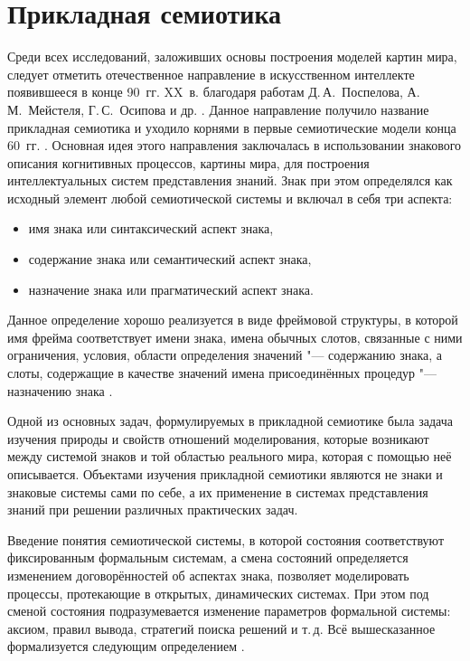 \section{Прикладная семиотика} \label{sect1_3}

Среди всех исследований, заложивших основы построения моделей картин мира, следует отметить отечественное направление в искусственном интеллекте появившееся в конце 90~гг. XX~в. благодаря работам Д.\,А.~Поспелова, А.\,М.~Мейстеля, Г.\,С.~Осипова и др. \cite{Osipov1995,Pospelov1996,Ehrlich1997,Osipov1999,Osipov2000b,Osipov2002a,Osipov2002b}. Данное направление получило название прикладная семиотика и уходило корнями в первые семиотические модели конца 60~гг. \cite{Pospelov1976}. Основная идея этого направления заключалась в использовании знакового описания когнитивных процессов, картины мира, для построения интеллектуальных систем представления знаний. Знак при этом определялся как исходный элемент любой семиотической системы и включал в себя три аспекта:
\begin{itemize}
	\item имя знака или синтаксический аспект знака,
	\item содержание знака или семантический аспект знака,
	\item назначение знака или прагматический аспект знака.
\end{itemize}

Данное определение хорошо реализуется в виде фреймовой структуры, в которой имя фрейма соответствует имени знака, имена обычных слотов, связанные с ними ограничения, условия, области определения значений "--- содержанию знака, а слоты, содержащие в качестве значений имена присоединённых процедур "--- назначению знака \cite{Osipov1999}. 

Одной из основных задач, формулируемых в прикладной семиотике была задача изучения природы и свойств отношений моделирования, которые возникают между системой знаков и той областью реального мира, которая с помощью неё описывается. Объектами изучения прикладной семиотики являются не знаки и знаковые системы сами по себе, а  их применение в системах представления знаний при решении различных практических задач.

Введение понятия семиотической системы, в которой состояния соответствуют фиксированным формальным системам, а смена состояний определяется изменением договорённостей об аспектах знака, позволяет моделировать процессы, протекающие в открытых, динамических системах. При этом под сменой состояния подразумевается изменение параметров формальной системы: аксиом, правил вывода, стратегий поиска решений и т.\,д. Всё вышесказанное формализуется следующим определением \cite{Osipov2002a}.

